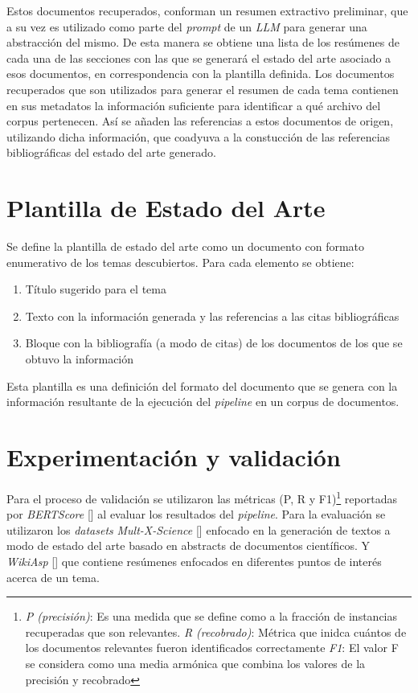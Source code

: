     Estos documentos recuperados, conforman un resumen extractivo preliminar, que a su vez es utilizado como parte del \emph{prompt} de un \emph{LLM} para generar una abstracción del mismo. De esta manera se obtiene una lista de los resúmenes de cada una de las secciones con las que se generará el estado del arte asociado a esos documentos, en correspondencia con la plantilla definida.
    Los documentos recuperados que son utilizados para generar el resumen de cada tema contienen en sus metadatos la información suficiente para identificar a qué archivo del corpus pertenecen. Así se añaden las referencias a estos documentos de origen, utilizando dicha información, que coadyuva a la constucción de las referencias bibliográficas del estado del arte generado.


\section{Plantilla de Estado del Arte}
Se define la plantilla de estado del arte como un documento con formato enumerativo de los temas descubiertos. Para cada elemento se obtiene:
\begin{enumerate}
    \item Título sugerido para el tema
    \item Texto con la información generada y las referencias a las citas bibliográficas
    \item Bloque con la bibliografía (a modo de citas) de los documentos de los que se obtuvo la información
\end{enumerate}

Esta plantilla es una definición del formato del documento que se genera con la información resultante de la ejecución del \emph{pipeline} en un corpus de documentos.

\section{Experimentación y validación}
Para el proceso de validación se utilizaron las m\'etricas (P, R y F1)\footnote{\emph{P (precisión)}: Es una medida que se define como a la fracción de instancias recuperadas que son relevantes. \emph{R (recobrado)}: M\'etrica que inidca cu\'antos de los documentos relevantes fueron identificados correctamente \emph{F1}: El valor F se considera como una media armónica que combina los valores de la precisión y recobrado} reportadas por \emph{BERTScore} [\cite{bertscore}] al evaluar los resultados del \emph{pipeline}.
Para la evaluación se utilizaron los \emph{datasets} \emph{Mult-X-Science} [\cite{multixscience}] enfocado en la generación de textos a modo de estado del arte basado en abstracts de documentos científicos. Y \emph{WikiAsp} [\cite{wikiasp}] que contiene resúmenes enfocados en diferentes puntos de interés acerca de un tema.

